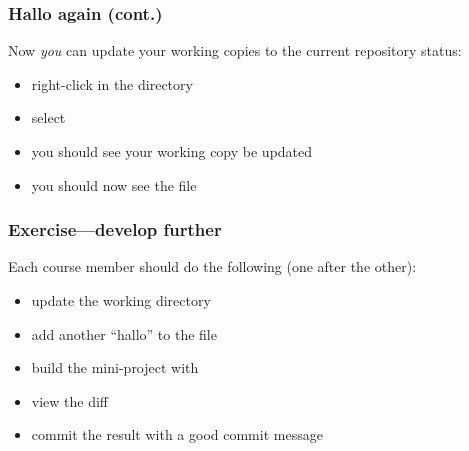 \begin{frame}[fragile]
    \frametitle{Hallo again (cont.)}

    Now \emph{you} can update your working copies to the current repository
    status:
    \begin{itemize}
        \item right-click in the  directory
        \item select 
        \item you should see your working copy be updated
        \item you should now see the  file
    \end{itemize}
    \begin{center}
    \end{center}

\end{frame}

\begin{frame}[fragile]
    \frametitle{Exercise---develop  further}

    Each course member should do the following (one after the other):
    \begin{itemize}
        \item update the working directory
        \item add another \enquote{hallo} to the  file
        \item build the mini-project with 
        \item view the diff
        \item commit the result with a good commit message
    \end{itemize}
\end{frame}


